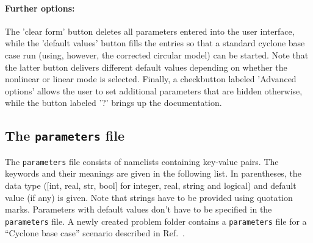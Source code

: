 \documentclass[12pt]{article}
\begin{document}
\paragraph{Further options:}
The 'clear form' button deletes all parameters entered into the user interface, while the 'default
values' button fills the entries so that a standard cyclone base case run (using, however, the
corrected circular model) can be started. Note that the latter button delivers different default
values depending on whether the nonlinear or linear mode is selected. Finally, a checkbutton
labeled 'Advanced options' allows the user to set additional parameters that are hidden otherwise,
while the button labeled '?' brings up the \gene documentation.

\newpage
\subsection{The \texttt{parameters} file} \label{subsec:parameters}

The \texttt{parameters} file consists of namelists containing key-value pairs.
The keywords and their meanings are given in the following list.
In parentheses, the data type ([int, real, str, bool] for integer, real, string and logical)
and default value (if any) is given. Note that strings have to be provided using quotation marks.
Parameters with default values don't have to be specified in the \texttt{parameters} file.
A newly created problem folder contains a \texttt{parameters} file for a ``Cyclone base case''
scenario described in Ref.~\cite{cyclone}.
\end{document}
